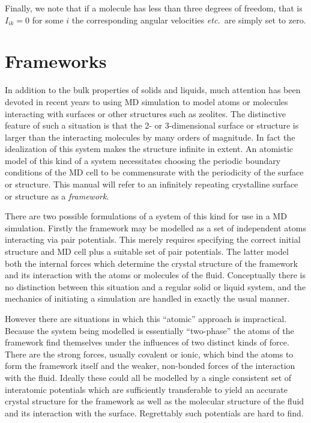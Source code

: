 \documentclass[a4paper,twoside]{report}
\newcommand{\etc}{\emph{etc.}}
\begin{document}
Finally, we note that if a molecule has less than three degrees of
freedom, that is $I_{ik}=0$ for some $i$ the corresponding angular
velocities \etc\ are simply set to zero.

\section{Frameworks}%
\label{sec:frameworks}
In addition to the bulk properties of solids and liquids, much
attention has been devoted in recent years to using MD simulation to
model atoms or molecules interacting with surfaces or other structures
such as zeolites.  The distinctive feature of such a situation is that
the 2- or 3-dimensional surface or structure is larger than the
interacting molecules by many orders of magnitude.  In fact the
idealization of this system makes the structure infinite in extent.
An atomistic model of this kind of a system necessitates choosing the
periodic boundary conditions of the MD cell to be commensurate with
the periodicity of the surface or structure.  This manual will refer
to an infinitely repeating crystalline surface or structure as a
\emph{framework}.

There are two possible formulations of a system of this kind for use
in a MD simulation.  Firstly the framework may be modelled as a set of
independent atoms interacting via pair potentials.  This merely
requires specifying the correct initial structure and MD cell plus a
suitable set of pair potentials. The latter model both the internal
forces which determine the crystal structure of the framework and its
interaction with the atoms or molecules of the fluid.  Conceptually
there is no distinction between this situation and a regular solid or
liquid system, and the mechanics of initiating a simulation are
handled in exactly the usual manner.

However there are situations in which this ``atomic'' approach is
impractical.  Because the system being modelled is essentially
``two-phase'' the atoms of the framework find themselves under the
influences of two distinct kinds of force.  There are the strong
forces, usually covalent or ionic, which bind the atoms to form the
framework itself and the weaker, non-bonded forces of the interaction
with the fluid.  Ideally these could all be modelled by a single
consistent set of interatomic potentials which are sufficiently
transferable to yield an accurate crystal structure for the framework
as well as the molecular structure of the fluid and its interaction
with the surface.  Regrettably such potentials are hard to find.
\end{document}
